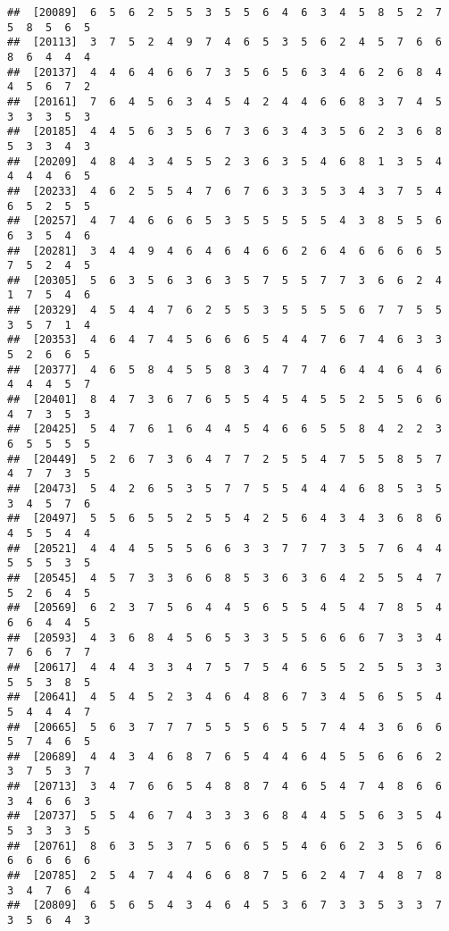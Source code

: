 \documentclass[
]{book}
\begin{document}
\begin{verbatim}
##  [20089]  6  5  6  2  5  5  3  5  5  6  4  6  3  4  5  8  5  2  7  5  8  5  6  5
##  [20113]  3  7  5  2  4  9  7  4  6  5  3  5  6  2  4  5  7  6  6  8  6  4  4  4
##  [20137]  4  4  6  4  6  6  7  3  5  6  5  6  3  4  6  2  6  8  4  4  5  6  7  2
##  [20161]  7  6  4  5  6  3  4  5  4  2  4  4  6  6  8  3  7  4  5  3  3  3  5  3
##  [20185]  4  4  5  6  3  5  6  7  3  6  3  4  3  5  6  2  3  6  8  5  3  3  4  3
##  [20209]  4  8  4  3  4  5  5  2  3  6  3  5  4  6  8  1  3  5  4  4  4  4  6  5
##  [20233]  4  6  2  5  5  4  7  6  7  6  3  3  5  3  4  3  7  5  4  6  5  2  5  5
##  [20257]  4  7  4  6  6  6  5  3  5  5  5  5  5  4  3  8  5  5  6  6  3  5  4  6
##  [20281]  3  4  4  9  4  6  4  6  4  6  6  2  6  4  6  6  6  6  5  7  5  2  4  5
##  [20305]  5  6  3  5  6  3  6  3  5  7  5  5  7  7  3  6  6  2  4  1  7  5  4  6
##  [20329]  4  5  4  4  7  6  2  5  5  3  5  5  5  5  6  7  7  5  5  3  5  7  1  4
##  [20353]  4  6  4  7  4  5  6  6  6  5  4  4  7  6  7  4  6  3  3  5  2  6  6  5
##  [20377]  4  6  5  8  4  5  5  8  3  4  7  7  4  6  4  4  6  4  6  4  4  4  5  7
##  [20401]  8  4  7  3  6  7  6  5  5  4  5  4  5  5  2  5  5  6  6  4  7  3  5  3
##  [20425]  5  4  7  6  1  6  4  4  5  4  6  6  5  5  8  4  2  2  3  6  5  5  5  5
##  [20449]  5  2  6  7  3  6  4  7  7  2  5  5  4  7  5  5  8  5  7  4  7  7  3  5
##  [20473]  5  4  2  6  5  3  5  7  7  5  5  4  4  4  6  8  5  3  5  3  4  5  7  6
##  [20497]  5  5  6  5  5  2  5  5  4  2  5  6  4  3  4  3  6  8  6  4  5  5  4  4
##  [20521]  4  4  4  5  5  5  6  6  3  3  7  7  7  3  5  7  6  4  4  5  5  5  3  5
##  [20545]  4  5  7  3  3  6  6  8  5  3  6  3  6  4  2  5  5  4  7  5  2  6  4  5
##  [20569]  6  2  3  7  5  6  4  4  5  6  5  5  4  5  4  7  8  5  4  6  6  4  4  5
##  [20593]  4  3  6  8  4  5  6  5  3  3  5  5  6  6  6  7  3  3  4  7  6  6  7  7
##  [20617]  4  4  4  3  3  4  7  5  7  5  4  6  5  5  2  5  5  3  3  5  5  3  8  5
##  [20641]  4  5  4  5  2  3  4  6  4  8  6  7  3  4  5  6  5  5  4  5  4  4  4  7
##  [20665]  5  6  3  7  7  7  5  5  5  6  5  5  7  4  4  3  6  6  6  5  7  4  6  5
##  [20689]  4  4  3  4  6  8  7  6  5  4  4  6  4  5  5  6  6  6  2  3  7  5  3  7
##  [20713]  3  4  7  6  6  5  4  8  8  7  4  6  5  4  7  4  8  6  6  3  4  6  6  3
##  [20737]  5  5  4  6  7  4  3  3  3  6  8  4  4  5  5  6  3  5  4  5  3  3  3  5
##  [20761]  8  6  3  5  3  7  5  6  6  5  5  4  6  6  2  3  5  6  6  6  6  6  6  6
##  [20785]  2  5  4  7  4  4  6  6  8  7  5  6  2  4  7  4  8  7  8  3  4  7  6  4
##  [20809]  6  5  6  5  4  3  4  6  4  5  3  6  7  3  3  5  3  3  7  3  5  6  4  3

\end{verbatim}
\end{document}
